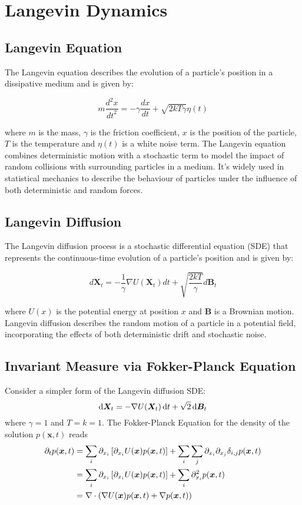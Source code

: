 \section{Langevin Dynamics}

\subsection{Langevin Equation}
The Langevin equation describes the evolution of a particle's position in a dissipative medium and is given by:

\[
	m \frac{ d^2 x }{ {dt}^2 } = - \gamma \frac{ d x }{ dt } + \sqrt{2 k T \gamma} \eta(t)
\]

where $m$ is the mass, $\gamma$ is the friction coefficient, $x$ is the position of the particle, $T$ is the temperature and $\eta(t)$ is a white noise term.
The Langevin equation combines deterministic motion with a stochastic term to model the impact of random collisions with surrounding particles in a medium. 
It's widely used in statistical mechanics to describe the behaviour of particles under the influence of both deterministic and random forces. 


\subsection{Langevin Diffusion}
The Langevin diffusion process is a stochastic differential equation (SDE) that represents the continuous-time evolution of a particle's position and is given by:

\[
	d\bm{X}_t = - \frac{ 1 }{ \gamma } \nabla U(\bm{X}_t) dt + \sqrt{\frac{ 2 k T }{ \gamma }} d\bm{B}_t
\]

where $U(x)$ is the potential energy at position $x$ and $\bm{B}$ is a Brownian motion.
Langevin diffusion describes the random motion of a particle in a potential field, incorporating the effects of both deterministic drift and stochastic noise.


\subsection{Invariant Measure via Fokker-Planck Equation} 
Consider a simpler form of the Langevin diffusion SDE:
\[
	\mathop{}\!\mathrm{d} \bm{X}_t = - \nabla U(\bm{X}_t) \mathop{}\!\mathrm{d} t + \sqrt{2} \mathop{}\!\mathrm{d} \bm{B}_t
\]
where $\gamma = 1$ and $T = k = 1$.
The Fokker-Planck Equation for the density of the solution $p(\bm{x}, t)$ reads
\[
\begin{aligned}
	\partial_t p(\bm{x},t) 
	&= \sum_i \partial_{x_i} \left[ \partial_{x_i} U(\bm{x}) p(\bm{x},t) \right] + \sum_i \sum_j \partial_{x_i} \partial_{x_j} \delta_{i,j} p(\bm{x},t) \\
	&= \sum_i \partial_{x_i} \left[ \partial_{x_i} U(\bm{x}) p(\bm{x},t) \right] + \sum_i \partial_{x_i}^2 p(\bm{x},t) \\
	&= \nabla \cdot \left( \nabla U(\bm{x}) p(\bm{x},t) + \nabla p(\bm{x},t) \right) \\
\end{aligned}
\]

